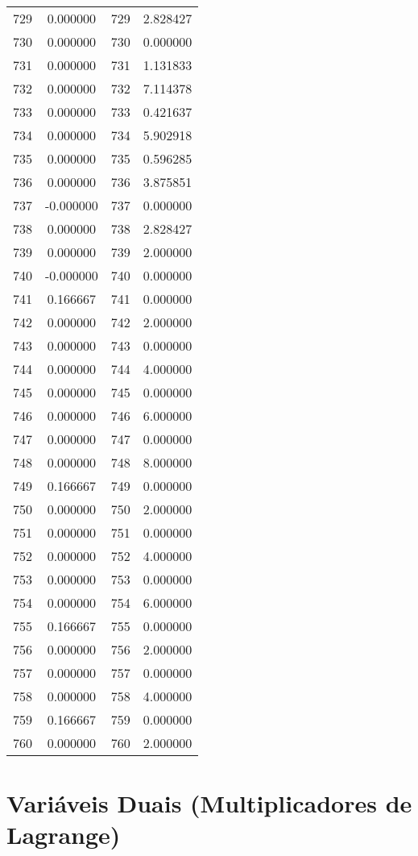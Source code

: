 \documentclass[12pt]{article}
\begin{document}
\begin{longtable}{@{}cccc@{}}
729 & 0.000000 & 729 & 2.828427 \\
730 & 0.000000 & 730 & 0.000000 \\
731 & 0.000000 & 731 & 1.131833 \\
732 & 0.000000 & 732 & 7.114378 \\
733 & 0.000000 & 733 & 0.421637 \\
734 & 0.000000 & 734 & 5.902918 \\
735 & 0.000000 & 735 & 0.596285 \\
736 & 0.000000 & 736 & 3.875851 \\
737 & -0.000000 & 737 & 0.000000 \\
738 & 0.000000 & 738 & 2.828427 \\
739 & 0.000000 & 739 & 2.000000 \\
740 & -0.000000 & 740 & 0.000000 \\
741 & 0.166667 & 741 & 0.000000 \\
742 & 0.000000 & 742 & 2.000000 \\
743 & 0.000000 & 743 & 0.000000 \\
744 & 0.000000 & 744 & 4.000000 \\
745 & 0.000000 & 745 & 0.000000 \\
746 & 0.000000 & 746 & 6.000000 \\
747 & 0.000000 & 747 & 0.000000 \\
748 & 0.000000 & 748 & 8.000000 \\
749 & 0.166667 & 749 & 0.000000 \\
750 & 0.000000 & 750 & 2.000000 \\
751 & 0.000000 & 751 & 0.000000 \\
752 & 0.000000 & 752 & 4.000000 \\
753 & 0.000000 & 753 & 0.000000 \\
754 & 0.000000 & 754 & 6.000000 \\
755 & 0.166667 & 755 & 0.000000 \\
756 & 0.000000 & 756 & 2.000000 \\
757 & 0.000000 & 757 & 0.000000 \\
758 & 0.000000 & 758 & 4.000000 \\
759 & 0.166667 & 759 & 0.000000 \\
760 & 0.000000 & 760 & 2.000000 \\

\end{longtable}

\section{Variáveis Duais (Multiplicadores de Lagrange)}
\end{document}
